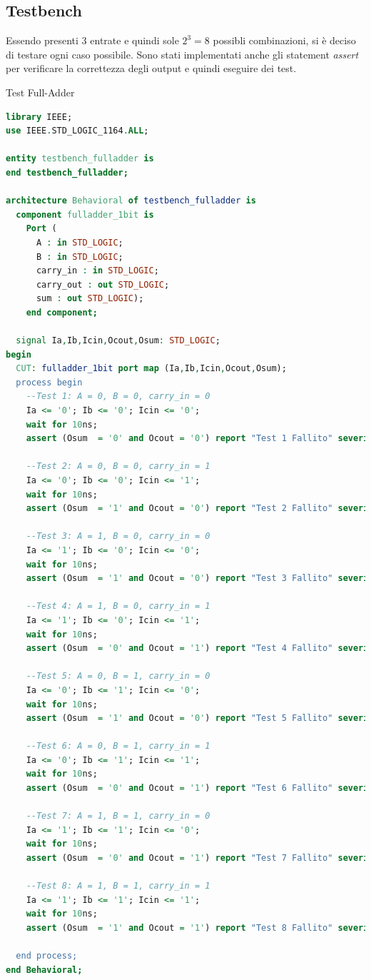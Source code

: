 \subsection{Testbench}
Essendo presenti 3 entrate e quindi sole \(2^3=8\) possibli combinazioni, si è deciso di testare ogni caso possibile. Sono stati implementati anche gli statement \textit{assert} per verificare la correttezza degli output e quindi eseguire dei test. 

\begin{problem}{Test Full-Adder}{}
\begin{lstlisting}[language=VHDL]
library IEEE;
use IEEE.STD_LOGIC_1164.ALL;

entity testbench_fulladder is
end testbench_fulladder;

architecture Behavioral of testbench_fulladder is
  component fulladder_1bit is
    Port ( 
      A : in STD_LOGIC;
      B : in STD_LOGIC;
      carry_in : in STD_LOGIC;
      carry_out : out STD_LOGIC;
      sum : out STD_LOGIC);
    end component;
    
  signal Ia,Ib,Icin,Ocout,Osum: STD_LOGIC;
begin
  CUT: fulladder_1bit port map (Ia,Ib,Icin,Ocout,Osum);
  process begin
    --Test 1: A = 0, B = 0, carry_in = 0
    Ia <= '0'; Ib <= '0'; Icin <= '0';
    wait for 10ns;
    assert (Osum  = '0' and Ocout = '0') report "Test 1 Fallito" severity error;

    --Test 2: A = 0, B = 0, carry_in = 1
    Ia <= '0'; Ib <= '0'; Icin <= '1';
    wait for 10ns;
    assert (Osum  = '1' and Ocout = '0') report "Test 2 Fallito" severity error;
        
    --Test 3: A = 1, B = 0, carry_in = 0
    Ia <= '1'; Ib <= '0'; Icin <= '0';
    wait for 10ns;
    assert (Osum  = '1' and Ocout = '0') report "Test 3 Fallito" severity error;

    --Test 4: A = 1, B = 0, carry_in = 1
    Ia <= '1'; Ib <= '0'; Icin <= '1';
    wait for 10ns;
    assert (Osum  = '0' and Ocout = '1') report "Test 4 Fallito" severity error;

    --Test 5: A = 0, B = 1, carry_in = 0
    Ia <= '0'; Ib <= '1'; Icin <= '0';
    wait for 10ns;
    assert (Osum  = '1' and Ocout = '0') report "Test 5 Fallito" severity error;

    --Test 6: A = 0, B = 1, carry_in = 1
    Ia <= '0'; Ib <= '1'; Icin <= '1';
    wait for 10ns;
    assert (Osum  = '0' and Ocout = '1') report "Test 6 Fallito" severity error;
        
    --Test 7: A = 1, B = 1, carry_in = 0
    Ia <= '1'; Ib <= '1'; Icin <= '0';
    wait for 10ns;
    assert (Osum  = '0' and Ocout = '1') report "Test 7 Fallito" severity error;
        
    --Test 8: A = 1, B = 1, carry_in = 1 
    Ia <= '1'; Ib <= '1'; Icin <= '1';
    wait for 10ns;
    assert (Osum  = '1' and Ocout = '1') report "Test 8 Fallito" severity error;
    
  end process;
end Behavioral;
\end{lstlisting}
\end{problem}
\newpage

